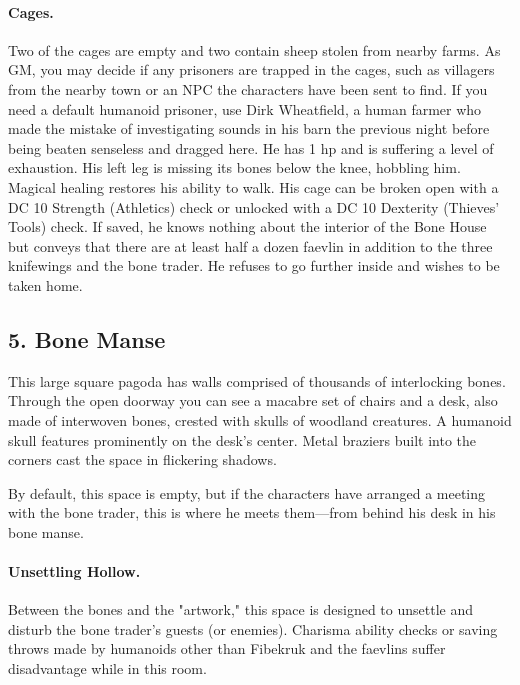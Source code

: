 \documentclass[10pt,a4paper,twoside,twocolumn,openany,bg=print,nodeprecatedcode]{dndbook}
\begin{document}
\paragraph{Cages.}
Two of the cages are empty and two contain sheep stolen from nearby farms. As GM, you may decide if any prisoners are trapped in the cages, such as villagers from the nearby town or an NPC the characters have been sent to find. If you need a default humanoid prisoner, use Dirk Wheatfield, a human farmer who made the mistake of investigating sounds in his barn the previous night before being beaten senseless and dragged here. He has 1 hp and is suffering a level of exhaustion. His left leg is missing its bones below the knee, hobbling him. Magical healing restores his ability to walk.
His cage can be broken open with a DC 10 Strength (Athletics) check or unlocked with a DC 10 Dexterity (Thieves' Tools) check. If saved, he knows nothing about the interior of the Bone House but conveys that there are at least half a dozen faevlin in addition to the three knifewings and the bone trader. He refuses to go further inside and wishes to be taken home.
\subsection{5. Bone Manse}
\begin{DndReadAloud}{}
This large square pagoda has walls comprised of thousands of interlocking bones. Through the open doorway you can see a macabre set of chairs and a desk, also made of interwoven bones, crested with skulls of woodland creatures. A humanoid skull features prominently on the desk's center. Metal braziers built into the corners cast the space in flickering shadows.
\end{DndReadAloud}

By default, this space is empty, but if the characters have arranged a meeting with the bone trader, this is where he meets them—from behind his desk in his bone manse.
\paragraph{Unsettling Hollow.}
Between the bones and the "artwork," this space is designed to unsettle and disturb the bone trader's guests (or enemies). Charisma ability checks or saving throws made by humanoids other than Fibekruk and the faevlins suffer disadvantage while in this room.
\end{document}
